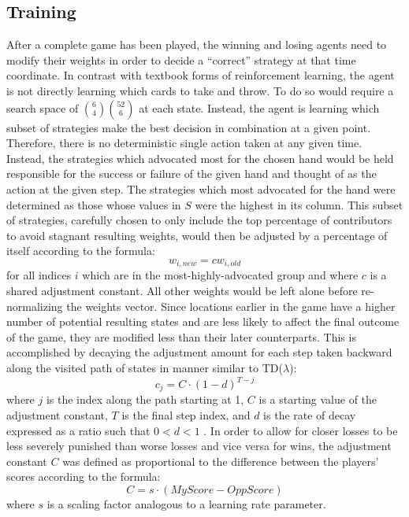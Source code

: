 
\subsection{Training}
\label{sec:dm-methods-training}




After a complete game has been played, the winning and losing agents need to
modify their weights in order to decide a ``correct'' strategy at that time
coordinate.
%
In contrast with textbook forms of reinforcement learning,
the agent is not directly learning which cards to take and throw.
%
To do so would require a search space of ${6 \choose 4}{52 \choose 6}$
at each state.
%
Instead, the agent is learning which subset of strategies make the best
decision in combination at a given point.
%
Therefore, there is no deterministic single action taken at any given
time.
%
Instead, the strategies which advocated most for the chosen hand would be held
responsible for the success or failure of the given hand and thought of as
the action at the given step.
%
The strategies which most advocated for the hand were determined as those whose
values in $S$ were the highest in its column.
%
This subset of strategies,
carefully chosen to only include the top percentage of contributors
to avoid stagnant resulting weights,
would then be adjusted by a percentage of itself according to the formula:
\[
	w_{i,new} = c w_{i,old}
\]
for all indices $i$ which are in the most-highly-advocated group and
where $c$ is a shared adjustment constant.
%
All other weights would be left alone before re-normalizing the weights vector.
%
Since locations earlier in the game have a higher number of potential resulting
states and are less likely to affect the final outcome of the game,
they are modified less than their later counterparts.
%
This is accomplished by decaying the adjustment amount for each step taken
backward along the visited path of states in manner similar to TD($\lambda$):
\[
	c_j = C \cdot (1 - d)^{T-j}
\]
where $j$ is the index along the path starting at 1,
$C$ is a starting value of the adjustment constant,
$T$ is the final step index,
and $d$ is the rate of decay expressed as a ratio such that $0 < d < 1$
\cite{tdgammon}.
%
In order to allow for closer losses to be less severely punished than worse
losses and vice versa for wins,
the adjustment constant $C$ was defined as proportional to the difference
between the players' scores according to the formula:
\[
	C = s \cdot \left({MyScore} - {OppScore}\right) 
\]
where $s$ is a scaling factor analogous to a learning rate parameter.

